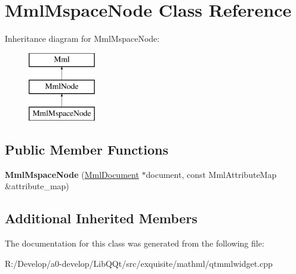 \hypertarget{class_mml_mspace_node}{}\section{Mml\+Mspace\+Node Class Reference}
\label{class_mml_mspace_node}
Inheritance diagram for Mml\+Mspace\+Node\+:\begin{figure}[H]
\begin{center}
\leavevmode
\includegraphics[height=3.000000cm]{class_mml_mspace_node}
\end{center}
\end{figure}
\subsection*{Public Member Functions}
\begin{DoxyCompactItemize}
\item 
\mbox{\label{class_mml_mspace_node_abcccf253ba37cc9308ec17825ecb16c8}} 
{\bfseries Mml\+Mspace\+Node} (\mbox{\hyperlink{class_mml_document}{Mml\+Document}} $\ast$document, const Mml\+Attribute\+Map \&attribute\+\_\+map)
\end{DoxyCompactItemize}
\subsection*{Additional Inherited Members}


The documentation for this class was generated from the following file\+:\begin{DoxyCompactItemize}
\item 
R\+:/\+Develop/a0-\/develop/\+Lib\+Q\+Qt/src/exquisite/mathml/qtmmlwidget.\+cpp\end{DoxyCompactItemize}

